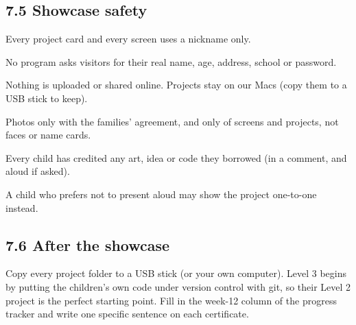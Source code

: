 \documentclass[level=2,teacher]{kidscode}
\begin{document}
\subsection{7.5 Showcase safety}
\begin{safety}
\begin{checklist}
  \item Every project card and every screen uses a nickname only.
  \item No program asks visitors for their real name, age, address, school or password.
  \item Nothing is uploaded or shared online. Projects stay on our Macs (copy them to a USB stick to
        keep).
  \item Photos only with the families' agreement, and only of screens and projects, not faces or name cards.
  \item Every child has credited any art, idea or code they borrowed (in a comment, and aloud if asked).
  \item A child who prefers not to present aloud may show the project one-to-one instead.
\end{checklist}
\end{safety}

\subsection{7.6 After the showcase}
Copy every project folder to a USB stick (or your own computer). Level 3 begins by putting the
children's own code under version control with git, so their Level 2 project is the perfect starting
point. Fill in the week-12 column of the progress tracker and write one specific sentence on each
certificate.
\end{document}
